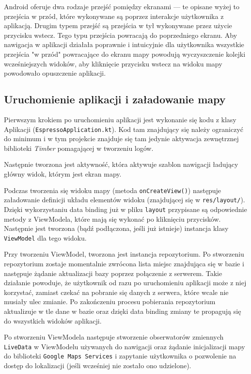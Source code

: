 \documentclass[polish,polish,a4paper,12pt]{article}
\begin{document}
		Android oferuje dwa rodzaje przejść pomiędzy ekranami \cite{androiddevelopment} — te opisane wyżej to przejścia w przód, które wykonywane są poprzez interakcje użytkownika z aplikacją. Drugim typem przejść są przejścia w tył wykonywane przez użycie przycisku wstecz. Tego typu przejścia powracają do poprzedniego ekranu. Aby nawigacja w aplikacji działała poprawnie i intuicyjnie dla użytkownika wszystkie przejścia "w przód" powracające do ekranu mapy powodują wyczyszczenie kolejki wcześniejszych widoków, aby kliknięcie przycisku wstecz na widoku mapy powodowało opuszczenie aplikacji.

	\subsection{Uruchomienie aplikacji i załadowanie mapy}

	Pierwszym krokiem po uruchomieniu aplikacji jest wykonanie się kodu z klasy Aplikacji (\texttt{EspressoApplication.kt}). Kod tam znajdujący się należy ograniczyć do minimum \cite{kotlin} i w tym projekcie znajduje się tam jedynie aktywacja zewnętrznej biblioteki \textit{Timber} pomagającej w tworzeniu logów.

	Następnie tworzona jest aktywność, która aktywuje szablon nawigacji ładujący główny widok, którym jest ekran mapy.

	Podczas tworzenia się widoku mapy (metoda \texttt{onCreateView()}) następuje załadowanie definicji układu elementów widoku (znajdującej się w \texttt{res/layout/}). Dzięki wykorzystaniu data binding już w pliku \texttt{layout} przypisane są odpowiednie metody z ViewModela, które mają się wykonać po kliknięciu przycisków. Następnie jest tworzona (bądź podłączona, jeśli już istnieje) instancja klasy \texttt{ViewModel} dla tego widoku.

	Przy tworzeniu ViewModel, tworzona jest instancja repozytorium. Po stworzeniu repozytorium zostaje momentalnie zwrócona lista miejsc znajdująca się w bazie i następuje żądanie aktualizacji bazy poprzez połączenie z serwerem. Takie działanie powoduje, że użytkownik od razu po uruchomieniu aplikacji może z niej korzystać, zamiast czekać na pobranie się danych z serwera, które wcale nie musiały ulec zmianie. Po zakończeniu procesu pobierania repozytorium aktualizuje w tle dane w bazie oraz dzięki data binding zmiany te propagują się do wszystkich widoków aplikacji.

	Po stworzeniu ViewModela następuje stworzenie obserwatorów zmiennych \texttt{LiveData} w ViewModelu używanych do nawigacji oraz żądanie inicjalizacji mapy do biblioteki \texttt{Google Maps Services} i zapytanie użytkownika o pozwolenie na dostęp do lokalizacji (jeśli wcześniej nie zostało ono udzielone).
\end{document}
